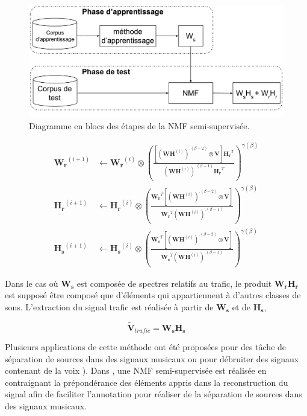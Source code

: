\begin{figure}[t]
\centering
\includegraphics[width=.85\linewidth]{./figures/NMF/NMF_semi-supervised.pdf}
\caption{Diagramme en blocs des étapes de la NMF semi-supervisée.}
\label{fig:semi-supervised_learning}
\end{figure}

\begin{subequations}\label{eq:WH-SSupdate}
\begin{align}
\mathbf{W_r}^{(i+1)} &\leftarrow \mathbf{W_r}^{(i)}\otimes\left(\frac{\left[\left(\mathbf{WH}^{(i)} \right)^{.(\beta-2)}\otimes\mathbf{V} \right]\mathbf{H_r}^T}{\left(\mathbf{WH}^{(i)} \right)^{.(\beta-1)}\mathbf{H_r}^T}\right)^{\gamma(\beta)}\label{eq:W_r_SS}\\
\mathbf{H_r}^{(i+1)} &\leftarrow \mathbf{H_r}^{(i)}\otimes\left(\frac{\mathbf{W_r}^T \left[\left(\mathbf{WH}^{(i)} \right)^{.(\beta-2)}\otimes\mathbf{V} \right]}{\mathbf{W_r}^T \left(\mathbf{WH}^{(i)} \right)^{.(\beta-1)}}\right)^{\gamma(\beta)}\label{eq:H_r_SS}\\
\mathbf{H_s}^{(i+1)} &\leftarrow \mathbf{H_s}^{(i)}\otimes\left(\frac{\mathbf{W_s}^T \left[\left(\mathbf{WH}^{(i)} \right)^{.(\beta-2)}\otimes\mathbf{V} \right]}{\mathbf{W_s}^T \left(\mathbf{WH}^{(i)} \right)^{.(\beta-1)}}\right)^{\gamma(\beta)}\label{eq:H_s_SS}
\end{align}
\end{subequations}

Dans le cas où $\mathbf{W_s}$ est composée de spectres relatifs au trafic, le produit $\mathbf{W_r} \mathbf{H_r}$ est supposé être composé que d'éléments qui appartiennent à d'autres classes de sons. L'extraction du signal trafic est réalisée à partir de $\mathbf{W_s}$ et de $\mathbf{H_s}$,

\begin{equation}\label{eq:WSHs_trafic}
\mathbf{\tilde{V}}_{trafic} = \mathbf{W_s H_s}
\end{equation}

Plusieurs applications de cette méthode ont été proposées pour des tâche de séparation de sources dans des signaux musicaux \cite{smaragdis2007supervised} ou pour débruiter des signaux contenant de la voix \cite{mysore2011non, duan2012online}). Dans \cite{lefevre2012semi}, une NMF semi-supervisée est réalisée en contraignant la prépondérance des éléments appris dans la reconstruction du signal afin de faciliter l'annotation pour réaliser de la séparation de sources dans des signaux musicaux.


